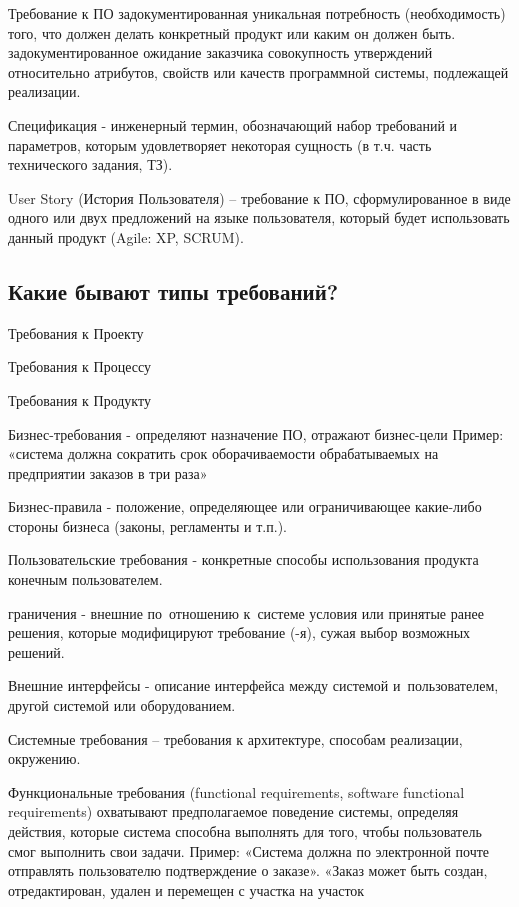 Требование к ПО
задокументированная уникальная потребность (необходимость) того, что должен
делать конкретный продукт или каким он должен быть.
задокументированное ожидание заказчика
совокупность утверждений относительно атрибутов, свойств или качеств
программной системы, подлежащей реализации.

Спецификация - инженерный термин, обозначающий набор требований и параметров,
которым удовлетворяет некоторая сущность (в т.ч. часть технического задания,
ТЗ). 

User Story (История Пользователя) – требование к ПО, сформулированное в виде
одного или двух предложений на языке пользователя, который будет использовать
данный продукт (Agile: XP, SCRUM).

\subsection{Какие бывают типы требований? }

Требования к Проекту


Требования к Процессу

Требования к Продукту

Бизнес-требования - определяют назначение ПО, отражают бизнес-цели
Пример: «система должна сократить срок оборачиваемости обрабатываемых на
предприятии заказов в три раза»

Бизнес-правила - положение, определяющее или ограничивающее какие-либо стороны
бизнеса (законы, регламенты и т.п.). 

Пользовательские требования - конкретные способы использования продукта
конечным пользователем.

граничения - внешние по отношению к системе условия или принятые ранее решения,
которые модифицируют требование (-я), сужая выбор возможных решений. 

Внешние интерфейсы - описание интерфейса между системой и пользователем, другой
системой или оборудованием.

Системные требования – требования к архитектуре, способам реализации,
окружению.


Функциональные требования (functional requirements, software functional
requirements)
охватывают предполагаемое поведение системы, определяя действия, которые
система способна выполнять для того, чтобы пользователь смог выполнить свои
задачи.
Пример: «Система должна по электронной почте отправлять пользователю
подтверждение о заказе». «Заказ может быть создан, отредактирован, удален и
перемещен с участка на участок

